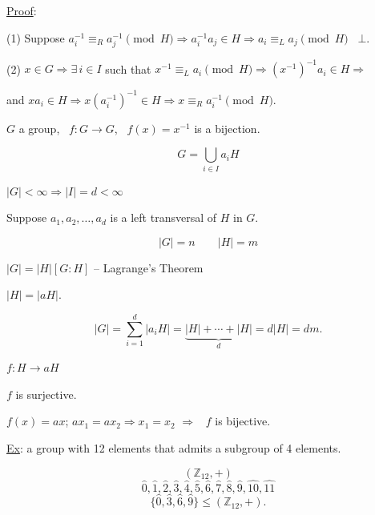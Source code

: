 \documentclass[12pt]{article}
\begin{document}
\noindent\underline{Proof}:

\bigskip
\noindent (1) Suppose $a_i^{-1}\equiv_R a_j^{-1} \pmod H \Rightarrow a_i^{-1}a_j\in H \Rightarrow a_i\equiv_L a_j \pmod H$ \ $\bot$.

\bigskip
\noindent (2) $x\in G \Rightarrow \exists\, i\in I$ such that $x^{-1}\equiv_L a_i \pmod H \Rightarrow (x^{-1})^{-1}a_i\in H \Rightarrow$

\noindent and $xa_i\in H \Rightarrow x(a_i^{-1})^{-1}\in H \Rightarrow x\equiv_R a_i^{-1} \pmod H$.

\bigskip
\noindent $G$ a group, \ $f:G\to G$, \ $f(x)=x^{-1}$ is a bijection.

\bigskip
\noindent
\[
G = \bigcup_{i\in I} a_iH
\]

\noindent $|G|<\infty \Rightarrow |I|=d<\infty$

\medskip
\noindent Suppose $a_1,a_2,\ldots,a_d$ is a left transversal of $H$ in $G$.

\[
|G|=n \qquad |H|=m
\]

\noindent $|G| = |H|[G:H]$ -- Lagrange's Theorem

\noindent $|H|=|aH|$.

\[
|G| = \sum_{i=1}^{d} |a_iH| = \underbrace{|H|+\cdots+|H|}_{d} = d|H| = dm.
\]

\noindent $f : H \to aH$

\noindent $f$ is surjective.

\noindent $f(x)=ax$; \quad $ax_1=ax_2 \Rightarrow x_1=x_2$ \quad $\Rightarrow$ \ $f$ is bijective.

\bigskip
\noindent\underline{Ex}: a group with 12 elements that admits a subgroup of 4 elements.

\[
(\mathbb{Z}_{12},+)
\]
\[
\hat 0,\hat 1,\hat 2,\hat 3,\hat 4,\hat 5,\hat 6,\hat 7,\hat 8,\hat 9,\hat{10},\hat{11}
\]
\[
\{\hat 0,\hat 3,\hat 6,\hat 9\} \leq (\mathbb{Z}_{12},+).
\]
\end{document}
